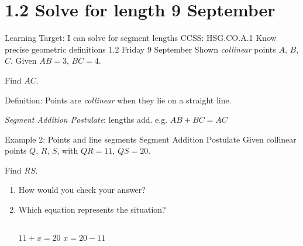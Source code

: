 \section{1.2 Solve for length \hfill 9 September}
\begin{frame}{Learning Target: I can solve for segment lengths}
  {CCSS: HSG.CO.A.1 Know precise geometric definitions  \hfill \alert{1.2 Friday 9 September}}
  Shown \emph{collinear} points $A$, $B$, $C$. Given $AB=3$, $BC=4$. \par
  Find $AC$.
    \begin{center}
    \end{center} \vspace{1cm}
  Definition: Points are \emph{collinear} when they lie on a straight line. \par \medskip
  \emph{Segment Addition Postulate}: lengths add. e.g. $AB+BC=AC$
\end{frame}

\begin{frame}{Example 2: Points and line segments}
  {Segment Addition Postulate}
  Given collinear points $Q$, $R$, $S$, with $QR=11$, $QS=20$. \par \bigskip
  Find $RS$.
  \begin{center}
  \end{center}
  \begin{enumerate}
    \item How would you check your answer?
    \item Which equation represents the situation?
    \begin{columns}[c]
      \hspace{2cm} $11 + x = 20$
      $x = 20 - 11$
    \end{columns}
  \end{enumerate}
  \end{frame}

